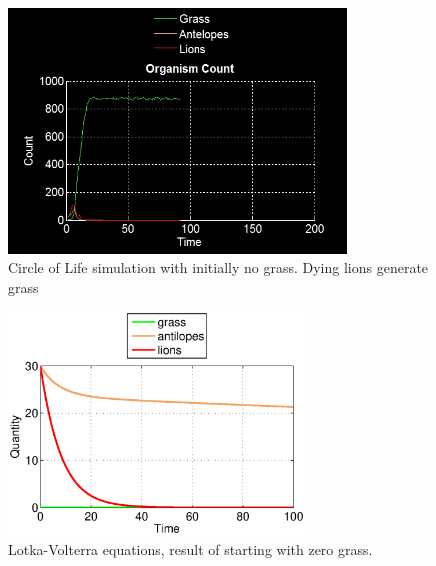\documentclass[11pt]{article}
\begin{document}
\begin{figure}
\centering
\includegraphics[width=0.8\textwidth]{noGrassOnlyCount.png}
\caption{Circle of Life simulation with initially no grass. Dying lions generate grass}
\label{fig:noGrass}
\end{figure}
\begin{figure}[p]
\centering
\includegraphics[width=0.7\textwidth]{LotkaVolterraNoGrass.eps}
\caption{Lotka-Volterra equations, result of starting with zero grass.}
\label{fig:LotkaNoGrass}
\end{figure}
\end{document}
